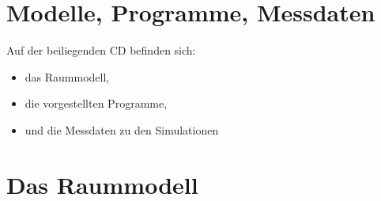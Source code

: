 \appendix

\chapter{Modelle, Programme, Messdaten}
\label{att:cd}
Auf der beiliegenden CD befinden sich:
\begin{itemize}
	\item das Raummodell,
	\item die vorgestellten Programme,
	\item und die Messdaten zu den Simulationen
\end{itemize}

\newpage


\chapter{Das Raummodell}
\label{att:raummod}















